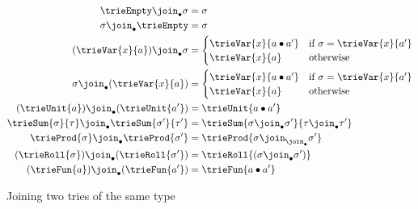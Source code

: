 \begin{figure}
\flushleft {}
{\small
\begin{align*}
\trieEmpty \join_{\bullet} \sigma
&=
\sigma
\\
\sigma \join_{\bullet} \trieEmpty
&=
\sigma
\\
(\trieVar{x}{a}) \join_{\bullet} \sigma
&=
\begin{cases}
\trieVar{x}{a \bullet a'}
& \text{if }\sigma = \trieVar{x}{a'}
\\
\trieVar{x}{a}
& \text{otherwise}
\end{cases}
\\
\sigma \join_{\bullet} (\trieVar{x}{a})
&=
\begin{cases}
\trieVar{x}{a \bullet a'}
& \text{if }\sigma = \trieVar{x}{a'}
\\
\trieVar{x}{a}
& \text{otherwise}
\end{cases}
\\
(\trieUnit{a}) \join_{\bullet} (\trieUnit{a'})
&=
\trieUnit{a \bullet a'}
\\
\trieSum{\sigma}{\tau} \join_{\bullet} \trieSum{\sigma'}{\tau'}
&=
\trieSum{\sigma \join_{\bullet} \sigma'}{\tau \join_{\bullet} \tau'}
\\
\trieProd{\sigma} \join_{\bullet} \trieProd{\sigma'}
&=
\trieProd{\sigma \join_{\join_{\bullet}} \sigma'}
\\
(\trieRoll{\sigma}) \join_{\bullet} (\trieRoll{\sigma'})
&=
\trieRoll{(\sigma \join_{\bullet} \sigma')}
\\
(\trieFun{a}) \join_{\bullet} (\trieFun{a'})
&=
\trieFun{a \bullet a'}
\end{align*}}
\caption{Joining two tries of the same type}
\end{figure}
